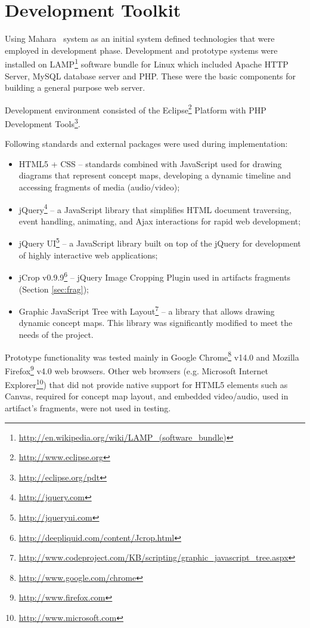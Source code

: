 \section{Development Toolkit}

Using Mahara \ep~system as an initial system defined technologies that were
employed in development phase. Development and prototype systems were installed
on LAMP\footnote{\url{http://en.wikipedia.org/wiki/LAMP_(software_bundle)}}
software bundle for Linux which included Apache HTTP Server, MySQL database
server and PHP. These were the basic components for building a general purpose
web server.

Development environment consisted of the
Eclipse\footnote{\url{http://www.eclipse.org}} Platform with PHP Development
Tools\footnote{\url{http://eclipse.org/pdt}}.

Following standards and external packages were used during implementation:

\begin{itemize}

\item HTML5 + CSS -- standards combined with JavaScript used for drawing
diagrams that represent concept maps, developing a dynamic timeline and
accessing fragments of media (audio/video);

\item jQuery\footnote{\url{http://jquery.com}} -- a JavaScript library that
simplifies HTML document traversing, event handling, animating, and Ajax
interactions for rapid web development;

\item jQuery UI\footnote{\url{http://jqueryui.com}} -- a JavaScript library
built on top of the jQuery for development of highly interactive web applications;

\item jCrop v0.9.9\footnote{\url{http://deepliquid.com/content/Jcrop.html}}
-- jQuery Image Cropping Plugin used in artifacts fragments (Section
\ref{sec:frag});

\item Graphic JavaScript Tree with
Layout\footnote{\url{http://www.codeproject.com/KB/scripting/graphic_javascript_tree.aspx}}
-- a library that allows drawing dynamic concept maps. This library was
significantly modified to meet the needs of the project.
\end{itemize}

Prototype functionality was tested mainly in Google
Chrome\footnote{\url{http://www.google.com/chrome}} v14.0 and Mozilla
Firefox\footnote{\url{http://www.firefox.com}} v4.0 web browsers. Other web
browsers (e.g. Microsoft Internet
Explorer\footnote{\url{http://www.microsoft.com}}) that did not provide native
support for HTML5 elements such as Canvas, required for concept map layout, and
embedded video/audio, used in artifact's fragments, were not used in testing.

